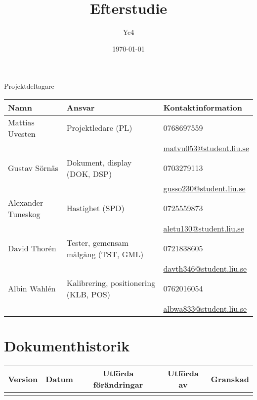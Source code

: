 \documentclass[10pt,oneside,swedish]{lips}
\title{Efterstudie}
\author{Yc4}
\date{\today}
\begin{document}
\maketitle

\cleardoublepage

\begin{center}
  \Large Projektdeltagare
\end{center}
\begin{center}
  \begin{tabular}{|l|l|l|} \hline
    \textbf{Namn} & \textbf{Ansvar} & \textbf{Kontaktinformation }\\\hline

    Mattias Uvesten & Projektledare (PL) & 0768697559\\
    && \url{matvu053@student.liu.se} \\\hline

    Gustav Sörnäs & Dokument, display (DOK, DSP) & 0703279113\\
    && \url{gusso230@student.liu.se} \\\hline

    Alexander Tuneskog & Hastighet (SPD) & 0725559873 \\
    && \url{aletu130@student.liu.se} \\\hline

    David Thorén & Tester, gemensam målgång (TST, GML) & 0721838605 \\
    && \url{davth346@student.liu.se} \\\hline

    Albin Wahlén & Kalibrering, positionering (KLB, POS) & 0762016054 \\
    && \url{albwa833@student.liu.se} \\\hline
  \end{tabular}
\end{center}

\cleardoublepage
\tableofcontents

\cleardoublepage
\section*{Dokumenthistorik}
\begin{tabular}{|p{}|p{}|p{}|p{}|p{}|} 
  \hline
  \multicolumn{1}{|c}{\bfseries Version} &
  \multicolumn{1}{|c}{\bfseries Datum} &
  \multicolumn{1}{|c}{\bfseries Utförda förändringar} &
  \multicolumn{1}{|c}{\bfseries Utförda av} &
  \multicolumn{1}{|c|}{\bfseries Granskad}\\
  \hline \hline
  &&&& \\
  \hline
\end{tabular}
\end{document}
